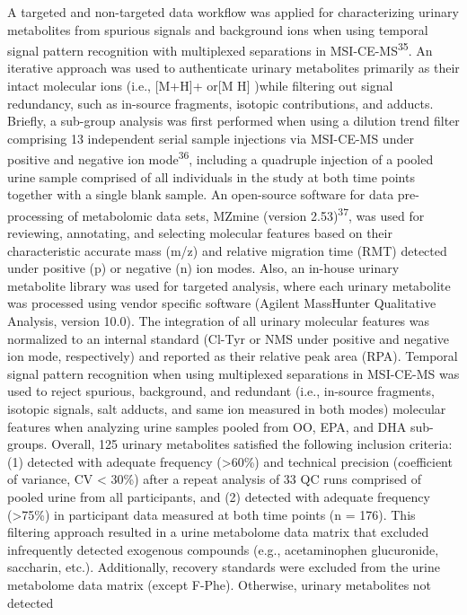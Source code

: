 \documentclass[journal=jacsat,manuscript=article]{achemso}
\begin{document}
A targeted and non-targeted data workflow was applied for characterizing
urinary metabolites from spurious signals and background ions when using
temporal signal pattern recognition with multiplexed separations in
MSI-CE-MS\textsuperscript{35}. An iterative approach was used to
authenticate urinary metabolites primarily as their intact molecular
ions (i.e., {[}M+H{]}+ or{[}M H{]} )while filtering out signal
redundancy, such as in-source fragments, isotopic contributions, and
adducts. Briefly, a sub-group analysis was first performed when using a
dilution trend filter comprising 13 independent serial sample injections
via MSI-CE-MS under positive and negative ion mode\textsuperscript{36},
including a quadruple injection of a pooled urine sample comprised of
all individuals in the study at both time points together with a single
blank sample. An open-source software for data pre-processing of
metabolomic data sets, MZmine (version 2.53)\textsuperscript{37}, was
used for reviewing, annotating, and selecting molecular features based
on their characteristic accurate mass (m/z) and relative migration time
(RMT) detected under positive (p) or negative (n) ion modes. Also, an
in-house urinary metabolite library was used for targeted analysis,
where each urinary metabolite was processed using vendor specific
software (Agilent MassHunter Qualitative Analysis, version 10.0). The
integration of all urinary molecular features was normalized to an
internal standard (Cl-Tyr or NMS under positive and negative ion mode,
respectively) and reported as their relative peak area (RPA). Temporal
signal pattern recognition when using multiplexed separations in
MSI-CE-MS was used to reject spurious, background, and redundant (i.e.,
in-source fragments, isotopic signals, salt adducts, and same ion
measured in both modes) molecular features when analyzing urine samples
pooled from OO, EPA, and DHA sub-groups. Overall, 125 urinary
metabolites satisfied the following inclusion criteria: (1) detected
with adequate frequency (\textgreater60\%) and technical precision
(coefficient of variance, CV \textless{} 30\%) after a repeat analysis
of 33 QC runs comprised of pooled urine from all participants, and (2)
detected with adequate frequency (\textgreater75\%) in participant data
measured at both time points (n = 176). This filtering approach resulted
in a urine metabolome data matrix that excluded infrequently detected
exogenous compounds (e.g., acetaminophen glucuronide, saccharin, etc.).
Additionally, recovery standards were excluded from the urine metabolome
data matrix (except F-Phe). Otherwise, urinary metabolites not detected
\end{document}
